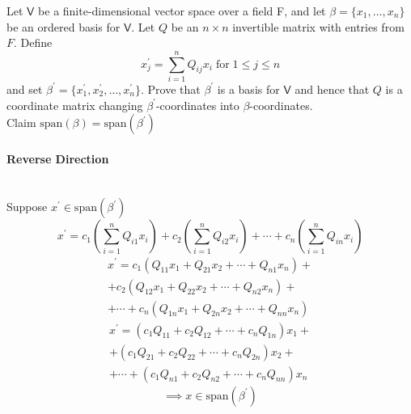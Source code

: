 Let $\mathsf{V}$ be a finite-dimensional vector space over a field F,
and let $\beta=\{x_1,\dotsc,x_n\}$ be an ordered basis for
$\mathsf{V}$. Let $Q$ be an $n\times n$ invertible matrix with
entries from $F$. Define
\[
x^\prime_j = \sum\limits^n_{i=1} Q_{ij}x_i \;\text{for}\; 1\leq j\leq n
\]
and set $\beta^\prime =
\{x_1^\prime,x_2^\prime,\dots,x_n^\prime\}$. Prove that $\beta^\prime$
is a basis for $\mathsf{V}$ and hence that $Q$ is a coordinate matrix
changing $\beta^\prime$-coordinates into $\beta$-coordinates.
\\Claim $\text{span}(\beta) =\text{span}(\beta^\prime)$
\paragraph{Reverse Direction}\hfill\\
Suppose $x^\prime \in \text{span}(\beta^\prime)$ 
\begin{equation}
x^\prime = c_1\left(\sum\limits_{i=1}^nQ_{i1}x_i\right) +
c_2\left(\sum\limits_{i=1}^nQ_{i2}x_i\right) + \cdots +
c_n\left(\sum\limits_{i=1}^nQ_{in}x_i\right)
\end{equation}
\begin{multline}
x^\prime = c_1\left(Q_{11}x_1 + Q_{21}x_2+\cdots+Q_{n1}x_n\right) + \\
 +c_2\left(Q_{12}x_1 + Q_{22}x_2 + \cdots + Q_{n2}x_n\right)+ \\ 
+ \cdots + c_n\left(Q_{1n}x_1 + Q_{2n}x_2 + \cdots + Q_{nn}x_n\right)
\end{multline}
\begin{multline}
x^\prime = (c_1Q_{11} + c_2Q_{12} + \cdots + c_nQ_{1n})x_1 + \\
+ (c_1Q_{21} +c_2Q_{22} + \cdots + c_nQ_{2n})x_2 +\\
+\cdots + (c_1Q_{n1} + c_2Q_{n2} + \cdots + c_nQ_{nn})x_n
\end{multline}
\begin{equation}
\implies x \in \text{span}(\beta^\prime)
\end{equation}
